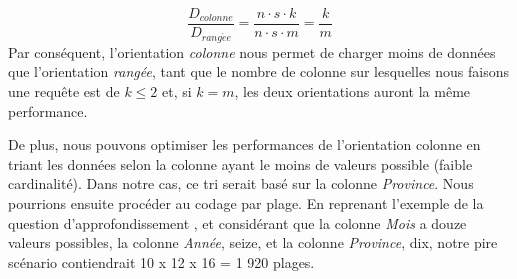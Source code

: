\documentclass{article}
\numberwithin{equation}{section} %
\begin{document}
\begin{equation}
    \frac{D_{colonne}}{D_{rang\acute{e}e}} = \frac{n \cdot s \cdot k}{n \cdot s \cdot m} = \frac{k}{m}
    \label{eq:ratio}
\end{equation}
Par conséquent, l'orientation \textit{colonne} nous permet de charger moins de données que l'orientation
\textit{rangée}, tant que le nombre de colonne sur lesquelles nous faisons une requête est de $k \leq 2$ et, si $k=m$, les deux orientations auront la même performance.

De plus, nous pouvons optimiser les performances de l'orientation colonne en triant les données selon la colonne ayant le moins de valeurs possible (faible cardinalité). Dans notre cas, ce tri serait basé sur la colonne \textit{Province}. Nous pourrions ensuite procéder au codage par plage. En reprenant l'exemple de la question d'approfondissement \cite{Lemire_2026}, et considérant que la colonne \textit{Mois} a douze valeurs possibles, la colonne \textit{Année}, seize, et la colonne \textit{Province}, dix, notre pire scénario contiendrait 10 x 12 x 16 = 1 920 plages. 

\newpage
\printbibliography
\end{document}
